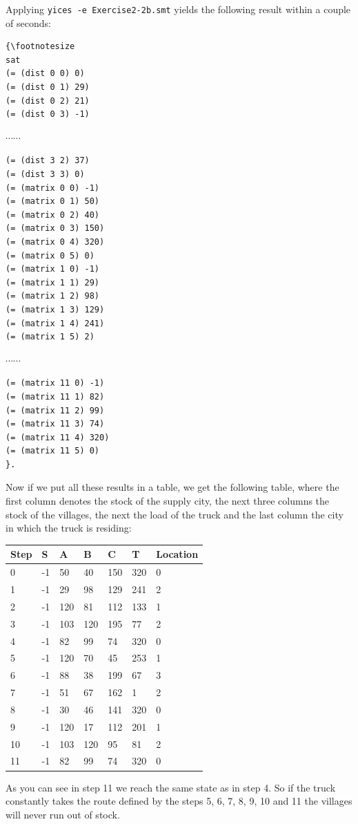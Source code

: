 \documentclass[12pt]{article}
\begin{document}
{\noindent Applying {\tt yices -e Exercise2-2b.smt} yields the following result within a couple of seconds:
\begin{verbatim}
{\footnotesize
sat
(= (dist 0 0) 0)
(= (dist 0 1) 29)
(= (dist 0 2) 21)
(= (dist 0 3) -1)
\end{verbatim}
$\cdots \cdots$ 
\begin{verbatim}
(= (dist 3 2) 37)
(= (dist 3 3) 0)
(= (matrix 0 0) -1)
(= (matrix 0 1) 50)
(= (matrix 0 2) 40)
(= (matrix 0 3) 150)
(= (matrix 0 4) 320)
(= (matrix 0 5) 0)
(= (matrix 1 0) -1)
(= (matrix 1 1) 29)
(= (matrix 1 2) 98)
(= (matrix 1 3) 129)
(= (matrix 1 4) 241)
(= (matrix 1 5) 2)
\end{verbatim}
$\cdots \cdots$ 
\begin{verbatim}
(= (matrix 11 0) -1)
(= (matrix 11 1) 82)
(= (matrix 11 2) 99)
(= (matrix 11 3) 74)
(= (matrix 11 4) 320)
(= (matrix 11 5) 0)
}.
\end{verbatim}
\noindent Now if we put all these results in a table, we get the following table, where the first column denotes the stock of the supply city, the next three columns the stock of the villages, the next the load of the truck and the last column the city in which the truck is residing:\\
\begin{center}
\begin{tabular}{| l | l | l | l | l | l | l |}
\hline
Step 	& S	& A	& B	& C 	& T 	& Location\\
\hline
0	& 	-1	&	50	&	40 	&	150	&	320	&	0	\\
1	& 	-1	&	29	&	98	&	129	&	241	&	2	\\
2	& 	-1	&	120	&	81 	&	112	&	133	&	1	\\
3	& 	-1	&	103	&	120 	&	195	&	77	&	2	\\
4	& 	-1	&	82	&	99	&	74	&	320	&	0	\\
5	& 	-1	&	120	&	70	&	45	&	253	&	1	\\
6	& 	-1	&	88	&	38 	&	199 	&	67	&	3	\\
7	& 	-1	&	51	&	67 	&	162	&	1	&	2	\\
8	& 	-1	&	30	&	46 	&	141	&	320	&	0	\\
9	& 	-1	&	120	&	17 	&	112	&	201	&	1	\\
10	& 	-1	&	103	&	120 	&	95	&	81	&	2	\\
11	& 	-1	&	82	&	99	&	74	&	320	&	0	\\
\hline
\end{tabular}
\end{center}
\vspace{3mm}
\noindent As you can see in step 11 we reach the same state as in step 4. So if the truck constantly takes the route defined by the steps 5, 6, 7, 8, 9, 10 and 11 the villages will never run out of stock.
\vspace{3mm}

}
\end{document}
